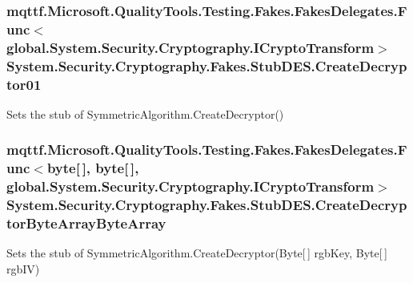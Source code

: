 \hypertarget{class_system_1_1_security_1_1_cryptography_1_1_fakes_1_1_stub_d_e_s_a59a9f696dc0ea09a8794a24972bf0035}{
\subsubsection[{Create\-Decryptor01}]{\setlength{\rightskip}{0pt plus 5cm}mqttf.\-Microsoft.\-Quality\-Tools.\-Testing.\-Fakes.\-Fakes\-Delegates.\-Func$<$global.\-System.\-Security.\-Cryptography.\-I\-Crypto\-Transform$>$ System.\-Security.\-Cryptography.\-Fakes.\-Stub\-D\-E\-S.\-Create\-Decryptor01}}\label{class_system_1_1_security_1_1_cryptography_1_1_fakes_1_1_stub_d_e_s_a59a9f696dc0ea09a8794a24972bf0035}


Sets the stub of Symmetric\-Algorithm.\-Create\-Decryptor()

\hypertarget{class_system_1_1_security_1_1_cryptography_1_1_fakes_1_1_stub_d_e_s_a01ce081d7085645341c704d9013b181a}{
\subsubsection[{Create\-Decryptor\-Byte\-Array\-Byte\-Array}]{\setlength{\rightskip}{0pt plus 5cm}mqttf.\-Microsoft.\-Quality\-Tools.\-Testing.\-Fakes.\-Fakes\-Delegates.\-Func$<$byte\mbox{[}$\,$\mbox{]}, byte\mbox{[}$\,$\mbox{]}, global.\-System.\-Security.\-Cryptography.\-I\-Crypto\-Transform$>$ System.\-Security.\-Cryptography.\-Fakes.\-Stub\-D\-E\-S.\-Create\-Decryptor\-Byte\-Array\-Byte\-Array}}\label{class_system_1_1_security_1_1_cryptography_1_1_fakes_1_1_stub_d_e_s_a01ce081d7085645341c704d9013b181a}


Sets the stub of Symmetric\-Algorithm.\-Create\-Decryptor(\-Byte\mbox{[}$\,$\mbox{]} rgb\-Key, Byte\mbox{[}$\,$\mbox{]} rgb\-I\-V)

